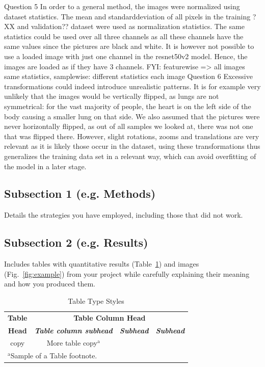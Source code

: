 \documentclass[conference]{IEEEtran}
\begin{document}
Question 5
In order to a general method, the images were normalized using dataset statistics. The mean and standarddeviation of all pixels in the training ?XX and validation?? dataset were used as normalization statistics. 
The same statistics could be used over all three channels as all these channels have the same values since the pictures are black and white. It is however not possible to use a loaded image with just one channel in the resnet50v2 model. Hence, the images are loaded as if they have 3 channels.
FYI: featurewise => all images same statistics, samplewise: different statistics each image
Question 6
Excessive transformations could indeed introduce unrealistic patterns. It is for example very unlikely that the images would be vertically flipped, as lungs are not symmetrical: for the vast majority of people, the heart is on the left side of the body causing a smaller lung on that side. 
We also assumed that the pictures were never horizontally flipped, as out of all samples we looked at, there was not one that was flipped there. However, slight rotations, zooms and translations are very relevant as it is likely those occur in the dataset, using these transformations thus generalizes the training data set in a relevant way, which can avoid overfitting of the model in a later stage.
\subsection{Subsection 1 (e.g. Methods)}
 Details the strategies you have employed, including those that did not work.

\subsection{Subsection 2 (e.g. Results)}
Includes tables with quantitative results (Table~\ref{table:example}) and images (Fig.~\ref{fig:example}) from your project while carefully explaining their meaning and how you produced them.
\begin{table}[htbp]
\caption{Table Type Styles}
\begin{center}
\begin{tabular}{|c|c|c|c|}
\hline
\textbf{Table}&\multicolumn{3}{|c|}{\textbf{Table Column Head}} \\
\cline{2-4} 
\textbf{Head} & \textbf{\textit{Table column subhead}}& \textbf{\textit{Subhead}}& \textbf{\textit{Subhead}} \\
\hline
copy& More table copy$^{\mathrm{a}}$& &  \\
\hline
\multicolumn{4}{l}{$^{\mathrm{a}}$Sample of a Table footnote.}
\end{tabular}
\label{table:example}
\end{center}
\end{table}
\end{document}
